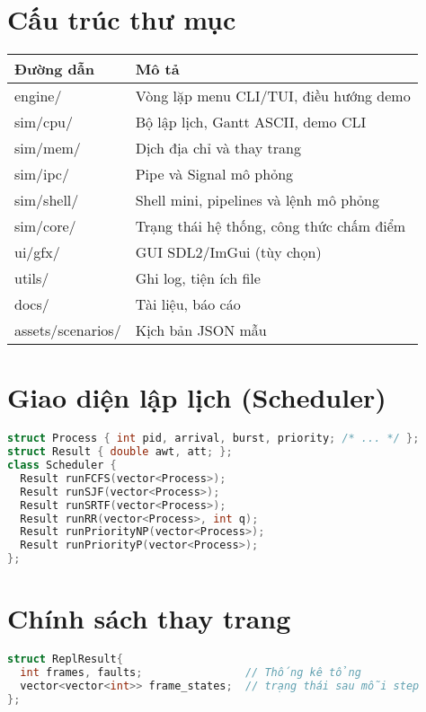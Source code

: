 \documentclass[12pt,a4paper]{report}
\begin{document}
\section{Cấu trúc thư mục}
\begin{longtable}{@{}ll@{}}
  \toprule
  \textbf{Đường dẫn} & \textbf{Mô tả}\\\midrule
  engine/ & Vòng lặp menu CLI/TUI, điều hướng demo\\
  sim/cpu/ & Bộ lập lịch, Gantt ASCII, demo CLI\\
  sim/mem/ & Dịch địa chỉ và thay trang\\
  sim/ipc/ & Pipe và Signal mô phỏng\\
  sim/shell/ & Shell mini, pipelines và lệnh mô phỏng\\
  sim/core/ & Trạng thái hệ thống, công thức chấm điểm\\
  ui/gfx/ & GUI SDL2/ImGui (tùy chọn)\\
  utils/ & Ghi log, tiện ích file\\
  docs/ & Tài liệu, báo cáo\\
  assets/scenarios/ & Kịch bản JSON mẫu\\\bottomrule
\end{longtable}

\section{Giao diện lập lịch (Scheduler)}
\begin{lstlisting}[language=C++,caption={struct Process và giao diện Scheduler}]
struct Process { int pid, arrival, burst, priority; /* ... */ };
struct Result { double awt, att; };
class Scheduler {
  Result runFCFS(vector<Process>);
  Result runSJF(vector<Process>);
  Result runSRTF(vector<Process>);
  Result runRR(vector<Process>, int q);
  Result runPriorityNP(vector<Process>);
  Result runPriorityP(vector<Process>);
};
\end{lstlisting}

\section{Chính sách thay trang}
\begin{lstlisting}[language=C++,caption={Kết quả thay trang}]
struct ReplResult{
  int frames, faults;                // Thống kê tổng
  vector<vector<int>> frame_states;  // trạng thái sau mỗi step
};
\end{lstlisting}
\end{document}
